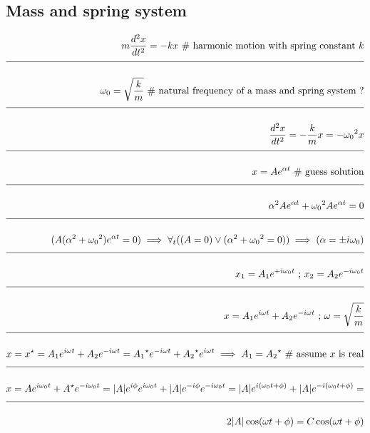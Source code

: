 \documentclass[a4paper]{article}
\newcommand{\eqComment}[1]{\text{  \# #1}}
\newcommand{\eqSep}{\text{ ;  }}
\newcommand{\n}{\\[1.5ex] \hline \nonumber \\[0ex]}
\begin{document}
\subsection{Mass and spring system}
\begin{tcolorbox}
\begin{align}
   m \frac{d^2 x}{dt^2} = -k x \eqComment{harmonic motion with spring constant $k$}
\n \omega_0 = \sqrt{\frac{k}{m}} \eqComment{natural frequency of a mass and spring system ?}
\n \frac{d^2 x}{dt^2} = -\frac{k}{m} x = -{\omega_0}^2 x
\n x = A e^{\alpha t} \eqComment{guess solution}
\n \alpha^2 A e^{\alpha t} + {\omega_0}^2 A e^{\alpha t} = 0
\n (A (\alpha^2 + {\omega_0}^2) e^{\alpha t} = 0) \implies \forall_t ( (A=0) \lor (\alpha^2 + {\omega_0}^2 = 0) ) \implies (\alpha = \pm i \omega_0)
\n x_1 = A_1 e^{+i \omega_0 t} \eqSep x_2 = A_2 e^{-i \omega_0 t}
\n x = A_1 e^{i \omega t} + A_2 e^{-i \omega t} \eqSep \omega = \sqrt{\frac{k}{m}}
\n x = x^\star = A_1 e^{i \omega t} + A_2 e^{-i \omega t} = {A_1}^\star e^{-i \omega t} + {A_2}^\star e^{i \omega t} \implies A_1 = {A_2}^\star \eqComment{assume $x$ is real}
\n x = A e^{i \omega_0 t} + A^\star e^{-i \omega_0 t} = |A| e^{i \phi} e^{i \omega_0 t} + |A| e^{-i \phi} e^{-i \omega_0 t} = |A| e^{i (\omega_0 t + \phi)} + |A| e^{-i (\omega_0 t + \phi)} =
\n 2 |A| \cos(\omega t + \phi) = C \cos(\omega t + \phi)
\end{align}
\end{tcolorbox}
\end{document}
